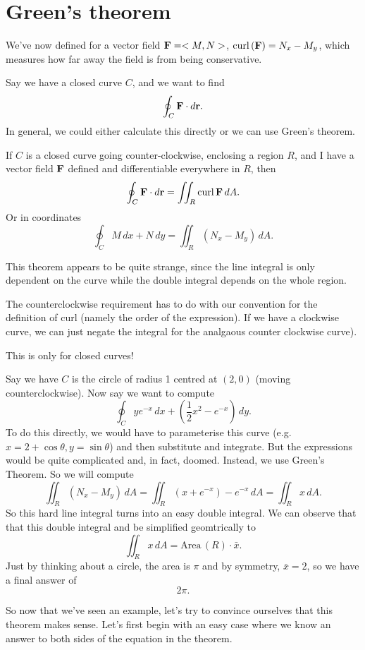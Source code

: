 \section{Green's theorem}

We've now defined for a vector field $\boldsymbol{\mathbf{F}} = <M,N>$, $\mathrm{curl}\,(\boldsymbol{\mathbf{F}}) = N_x - M_y$, which measures how far away the field is from being conservative. 

Say we have a closed curve $C$, and we want to find
\[ \oint_C \boldsymbol{\mathbf{F}} \cdot d\boldsymbol{\mathbf{r}}. \]
In general, we could either calculate this directly or we can use Green's theorem.

If $C$ is a closed curve going counter-clockwise, enclosing a region $R$, and I have a vector field $\boldsymbol{\mathbf{F}}$ defined and differentiable everywhere in $R$, then
\[ \oint_C \boldsymbol{\mathbf{F}} \cdot d\boldsymbol{\mathbf{r}} = \iint_R \mathrm{curl}\,{\boldsymbol{\mathbf{F}}}\,dA. \]
Or in coordinates
\[ \oint_C M\,dx + N\,dy = \iint_R (N_x - M_y)\,dA. \]
\etm

This theorem appears to be quite strange, since the line integral is only dependent on the curve while the double integral depends on the whole region. 

\brm
The counterclockwise requirement has to do with our convention for the definition of curl (namely the order of the expression). If we have a clockwise curve, we can just negate the integral for the analgaous counter clockwise curve).
\erm

\bdb
This is only for closed curves!
\edb

\bex
Say we have $C$ is the circle of radius 1 centred at $(2,0)$ (moving counterclockwise). Now say we want to compute
\[ \oint_C ye^{-x}\,dx + (\frac12x^2-e^{-x})\,dy. \]
To do this directly, we would have to parameterise this curve (e.g. $x = 2 + \cos \theta,y=\sin\theta$) and then substitute and integrate. But the expressions would be quite complicated and, in fact, doomed. Instead, we use Green's Theorem. So we will compute
\[ \iint_R (N_x - M_y)\,dA = \iint_R(x + e^{-x}) - e^{-x}\,dA = \iint_R x\,dA. \]
So this hard line integral turns into an easy double integral. We can observe that that this double integral and be simplified geomtrically to
\[ \iint_R x \,dA = \mathrm{Area}\,(R) \cdot \bar{x}. \]
Just by thinking about a circle, the area is $\pi$ and by symmetry, $\bar{x}=2$, so we have a final answer of 
\[ 2\pi. \]
\eex

So now that we've seen an example, let's try to convince ourselves that this theorem makes sense. Let's first begin with an easy case where we know an answer to both sides of the equation in the theorem.

